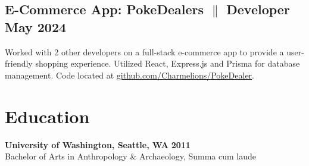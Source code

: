 \documentclass[a4paper,9pt]{article}
\begin{document}
\subsection{E-Commerce App: PokeDealers {$\parallel$}{ Developer}
      \hfill \textbf{May 2024}}
{ Worked with 2 other developers on a full-stack e-commerce
      app to provide a user-friendly shopping experience. Utilized React, Express.js and Prisma for database management. Code located
      at \href{https://github.com/Charmelions/PokeDealer}{github.com/Charmelions/PokeDealer}.}

\section{Education}
\textbf{University of Washington, Seattle, WA} \hfill
\textbf{2011}\\
Bachelor of Arts in Anthropology \& Archaeology, Summa cum laude
\end{document}
